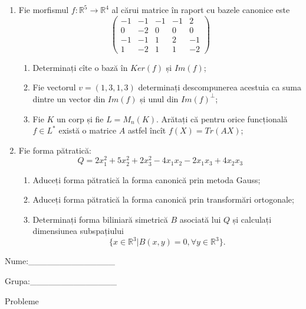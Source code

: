\documentclass{article}
\begin{document}
\begin{enumerate}
 \item Fie morfismul $f:\mathbb{R}^5 \to \mathbb{R}^4$ al cărui matrice în raport cu bazele canonice este
$$\begin{pmatrix}
-1&-1&-1&-1&2\\
0&-2&0&0&0\\
-1&-1&1&2&-1\\
1&-2&1&1&-2
\end{pmatrix}$$

\begin{enumerate}
\item Determinați cîte o bază în $Ker(f)$ și $Im(f)$;
\item Fie vectorul $v=(1,3,1,3)$ determinați descompunerea acestuia ca suma dintre un vector din $Im(f)$ și unul din $Im(f)^\perp$;
\item Fie $K$ un corp și fie $L=M_n(K)$. Arătați că pentru orice funcțională $f \in L^*$ există o matrice $A$ astfel încît $f(X)=Tr(AX)$;
\end{enumerate}
\item Fie forma pătratică:
$$Q= 2x_1^2+5x_2^2+2x_3^2-4x_1x_2-2x_1x_3+4x_2x_3$$

\begin{enumerate}
\item Aduceți forma pătratică la forma canonică prin metoda Gauss;
\item Aduceți forma pătratică la forma canonică prin transformări ortogonale;
\item Determinați forma biliniară simetrică $B$ asociată lui $Q$ și calculați dimensiunea subspațiului
$$\{x \in \mathbb{R}^3 | B(x,y)=0,\forall y \in \mathbb{R}^3\}.$$

\end{enumerate}
\end{enumerate}
\newpage
\begin{flushright}
Nume:\_\_\_\_\_\_\_\_\_\_\_\_\_\_
 
 
Grupa:\_\_\_\_\_\_\_\_\_\_\_\_\_\_
\end{flushright}
\begin{center}
\vspace{2cm}
{\Large Probleme}
\vspace{2cm}
\end{center}
\end{document}
